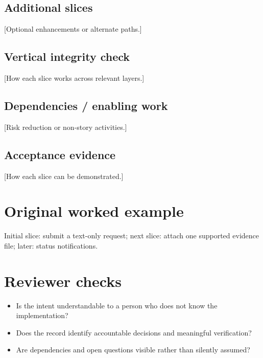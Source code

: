 \documentclass[11pt,letterpaper]{article}
\begin{document}
\subsection{Additional slices}
[Optional enhancements or alternate paths.]

\subsection{Vertical integrity check}
[How each slice works across relevant layers.]

\subsection{Dependencies / enabling work}
[Risk reduction or non-story activities.]

\subsection{Acceptance evidence}
[How each slice can be demonstrated.]

\section{Original worked example}
\begin{tcolorbox}[colback=tealback,colframe=navy,title={Illustrative entry},breakable]
Initial slice: submit a text-only request; next slice: attach one supported evidence file; later: status notifications.

\end{tcolorbox}
\section{Reviewer checks}
\begin{itemize}[leftmargin=*,itemsep=2pt]
\item Is the intent understandable to a person who does not know the implementation?
\item Does the record identify accountable decisions and meaningful verification?
\item Are dependencies and open questions visible rather than silently assumed?
\end{itemize}
\end{document}
